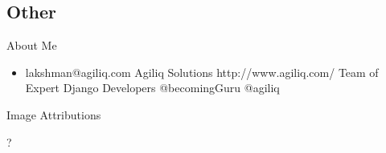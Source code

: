 \documentclass[19.9pt]{beamer}
\begin{document}
	
	\subsection{Other}
		\begin{frame}
			{About Me}
			\begin{itemize}
			\item
			lakshman@agiliq.com
			Agiliq Solutions http://www.agiliq.com/
			Team of Expert Django Developers
			@becomingGuru @agiliq
			\end{itemize}
		\end{frame}
		\begin{frame}
			{Image Attributions}
		\end{frame}
		\begin{frame}
			?
		\end{frame}
\end{document}
